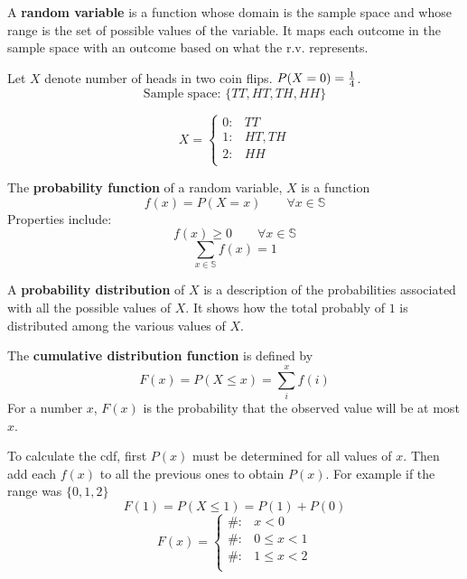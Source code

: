 \documentclass[english, 12pt]{article}
\begin{document}
\begin{defn}
A \textbf{random variable} is a function whose domain is the sample space and whose range is the set of possible values of the variable. It maps each outcome in the sample space with an outcome based on what the r.v. represents.

\begin{exmp}Let $X$ denote number of heads in two coin flips. $P(X = 0) = \frac{1}{4}$.
\[\text{Sample space: } \{TT,HT,TH,HH\}\]

\begin{displaymath}
   X = \left\{
     \begin{array}{lr}
       0 : &TT \\
       1 : &HT,TH\\
       2 : &HH\\
     \end{array}
   \right.
\end{displaymath}
\end{exmp}
\end{defn}

\begin{defn}
The \textbf{probability function} of a random variable, $X$ is a function
\[f(x) = P(X=x)\qquad \forall x \in \mathbb{S}\]
Properties include:
\[f(x) \geq 0 \qquad \forall x \in \mathbb{S}\]
\[\sum_{x \in \mathbb{S}} f(x) = 1\]
\end{defn}

\begin{defn}
A \textbf{probability distribution} of $X$ is a description of the probabilities associated with all the possible values of $X$. It shows how the total probably of $1$ is distributed among the various values of $X$.
\end{defn}

\begin{defn}
The \textbf{cumulative distribution function} is defined by
\[F(x) = P(X \leq x) = \sum_i^x f(i)\]
For a number $x$, $F(x)$ is the probability that the observed value will be at most $x$.
\end{defn}

\begin{mthd}
To calculate the cdf, first $P(x)$ must be determined for all values of $x$. Then add each $f(x)$ to all the previous ones to obtain $P(x)$. For example if the range was $\{0,1,2\}$
\[ F(1) = P(X \leq 1) = P(1) + P(0)\]
\begin{displaymath}
   F(x) = \left\{
     \begin{array}{lr}
       \# : & x < 0 \\
       \# : & 0 \leq x < 1\\
       \# : &1 \leq x < 2\\
     \end{array}
   \right.
\end{displaymath}
\end{mthd}
\end{document}
